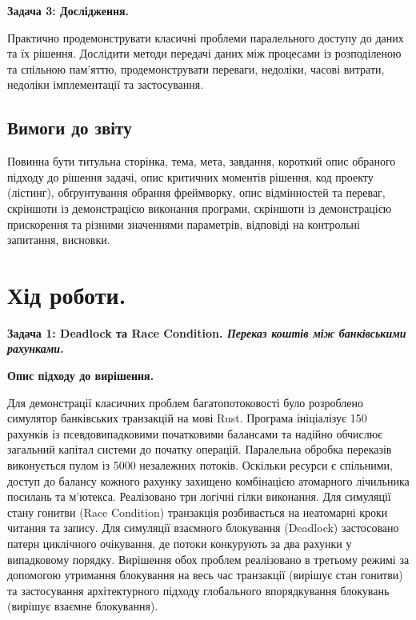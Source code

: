 \documentclass[14pt, a4paper]{extreport}
\begin{document}
	\textbf{Задача 3: Дослідження.}
	
	Практично продемонструвати класичні проблеми паралельного доступу до даних та їх рішення. Дослідити методи передачі даних між процесами із розподіленою та спільною пам’яттю, продемонструвати переваги, недоліки, часові витрати, недоліки імплементації та застосування.
	
	\subsection*{Вимоги до звіту}
	
	Повинна бути титульна сторінка, тема, мета, завдання, короткий опис обраного підходу до рішення задачі, опис критичних моментів рішення, код проекту (лістинг), обґрунтування обрання фреймворку, опис відмінностей та переваг, скріншоти із демонстрацією виконання програми, скріншоти із демонстрацією прискорення та різними значеннями параметрів, відповіді на контрольні запитання, висновки.
	
	\section*{Хід роботи.}
	
	\textbf{Задача 1: Deadlock та Race Condition. \textit{Переказ коштів між банківськими рахунками}.}
	
	\textbf{Опис підходу до вирішення.}
	
	Для демонстрації класичних проблем багатопотоковості було розроблено симулятор банківських транзакцій на мові Rust. Програма ініціалізує 150 рахунків із псевдовипадковими початковими балансами та надійно обчислює загальний капітал системи до початку операцій. Паралельна обробка переказів виконується пулом із 5000 незалежних потоків. Оскільки ресурси є спільними, доступ до балансу кожного рахунку захищено комбінацією атомарного лічильника посилань та м'ютекса. Реалізовано три логічні гілки виконання. Для симуляції стану гонитви (Race Condition) транзакція розбивається на неатомарні кроки читання та запису. Для симуляції взаємного блокування (Deadlock) застосовано патерн циклічного очікування, де потоки конкурують за два рахунки у випадковому порядку. Вирішення обох проблем реалізовано в третьому режимі за допомогою утримання блокування на весь час транзакції (вирішує стан гонитви) та застосування архітектурного підходу глобального впорядкування блокувань (вирішує взаємне блокування).
	
	
\end{document}
